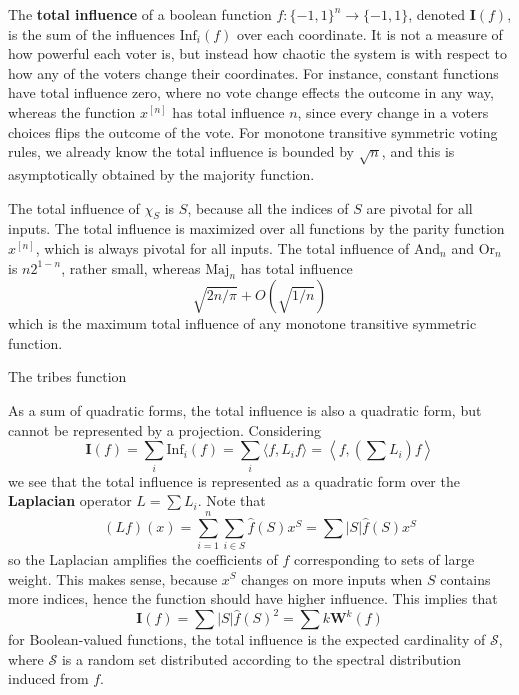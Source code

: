 The {\bf total influence} of a boolean function $f: \{ -1, 1 \}^n \to \{ -1, 1 \}$, denoted $\mathbf{I}(f)$, is the sum of the influences $\text{Inf}_i(f)$ over each coordinate. It is not a measure of how powerful each voter is, but instead how chaotic the system is with respect to how any of the voters change their coordinates. For instance, constant functions have total influence zero, where no vote change effects the outcome in any way, whereas the function $x^{[n]}$ has total influence $n$, since every change in a voters choices flips the outcome of the vote. For monotone transitive symmetric voting rules, we already know the total influence is bounded by $\sqrt{n}$, and this is asymptotically obtained by the majority function.

\begin{example}
    The total influence of $\chi_S$ is $S$, because all the indices of $S$ are pivotal for all inputs. The total influence is maximized over all functions by the parity function $x^{[n]}$, which is always pivotal for all inputs. The total influence of $\text{And}_n$ and $\text{Or}_n$ is $n2^{1-n}$, rather small, whereas $\text{Maj}_n$ has total influence
    \[ \sqrt{2n/\pi} + O \left( \sqrt{1/n} \right) \]
    which is the maximum total influence of any monotone transitive symmetric function.
\end{example}

\begin{example}
    The tribes function
\end{example}

As a sum of quadratic forms, the total influence is also a quadratic form, but cannot be represented by a projection. Considering
%
\[ \mathbf{I}(f) = \sum_i \text{Inf}_i(f) = \sum_i \langle f, L_i f \rangle = \left\langle f, \left( \sum L_i \right) f \right\rangle \]
%
we see that the total influence is represented as a quadratic form over the {\bf Laplacian} operator $L = \sum L_i$. Note that
%
\[ (Lf)(x) = \sum_{i = 1}^n \sum_{i \in S} \widehat{f}(S) x^S = \sum |S| \widehat{f}(S) x^S \]
%
so the Laplacian amplifies the coefficients of $f$ corresponding to sets of large weight. This makes sense, because $x^S$ changes on more inputs when $S$ contains more indices, hence the function should have higher influence. This implies that
%
\[ \mathbf{I}(f) = \sum |S| \widehat{f}(S)^2 = \sum k \mathbf{W}^k(f) \]
%
for Boolean-valued functions, the total influence is the expected cardinality of $\mathcal{S}$, where $\mathcal{S}$ is a random set distributed according to the spectral distribution induced from $f$.

